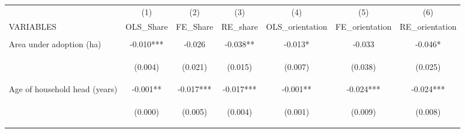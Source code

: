 \begin{center}
\begin{tabular}{lcccccc} \hline
 & (1) & (2) & (3) & (4) & (5) & (6) \\
VARIABLES & OLS\_Share & FE\_Share & RE\_share & OLS\_orientation & FE\_orientation & RE\_orientation \\ \hline
\vspace{4pt} & \begin{footnotesize}\end{footnotesize} & \begin{footnotesize}\end{footnotesize} & \begin{footnotesize}\end{footnotesize} & \begin{footnotesize}\end{footnotesize} & \begin{footnotesize}\end{footnotesize} & \begin{footnotesize}\end{footnotesize} \\
Area under adoption (ha) & -0.010*** & -0.026 & -0.038** & -0.013* & -0.033 & -0.046* \\
\vspace{4pt} & \begin{footnotesize}(0.004)\end{footnotesize} & \begin{footnotesize}(0.021)\end{footnotesize} & \begin{footnotesize}(0.015)\end{footnotesize} & \begin{footnotesize}(0.007)\end{footnotesize} & \begin{footnotesize}(0.038)\end{footnotesize} & \begin{footnotesize}(0.025)\end{footnotesize} \\
Age of household head (years) & -0.001** & -0.017*** & -0.017*** & -0.001** & -0.024*** & -0.024*** \\
\vspace{4pt} & \begin{footnotesize}(0.000)\end{footnotesize} & \begin{footnotesize}(0.005)\end{footnotesize} & \begin{footnotesize}(0.004)\end{footnotesize} & \begin{footnotesize}(0.001)\end{footnotesize} & \begin{footnotesize}(0.009)\end{footnotesize} & \begin{footnotesize}(0.008)\end{footnotesize} \\

\end{tabular}
\end{center}
